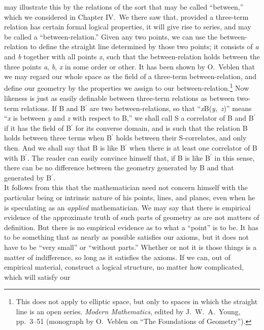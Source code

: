 {may illustrate this by the relations of the sort that may
be called
``between,'' which we considered in Chapter IV.\ We there saw that,
provided a three-term relation has certain formal logical properties,
it will give rise to series, and may be called a ``between-relation.''
Given any two points, we can use the between-relation to define the
straight line determined by those two points; it consists of \textit{a} and \textit{b}
together with all points \textit{x},
such that the between-relation holds
between the three points \textit{a},
\textit{b}, \textit{x} in some order or
other. It has been
shown by O.\ Veblen that we may regard our whole space as the field of a
three-term between-relation, and define our geometry by the properties
we assign to our between-relation.\footnote{This does not apply to
elliptic space, but only to spaces
in
which
the straight line is an open series. \textit{Modern Mathematics},
edited by J.\ W.\ A.\ Young, pp.\ 3--51 (monograph by O.\ Veblen on ``The Foundations of
Geometry'').} Now likeness
is just as easily  
definable between three-term relations as between two-term relations.
If B and B$^\prime$
are two between-relations, so that ``\textit{x}B(\textit{y},~\textit{z})'' means ``\textit{x} is
between \textit{y}
and \textit{z} with
respect to B,'' we shall call S a correlator of B
and B$^\prime$
if it has the field of B$^\prime$
for its converse domain, and is such
that the relation B holds between three terms when B$^\prime$ holds between
their S-correlates, and only then. And we shall say that B is
like B$^\prime$
when there is at least one correlator of B with B$^\prime$. The reader can
easily convince himself that, if B is like B$^\prime$ in this sense,
there can
be no difference between the geometry generated by B and that generated
by B$^\prime$.\\
\indent It follows from this that the mathematician need not
concern
himself
with the particular being or intrinsic nature of his points, lines, and
planes, even when he is speculating as an \textit{applied}
mathematician. We may
say that there is empirical evidence of the approximate truth of such
parts of geometry as are not matters of definition. But there is no
empirical evidence as to what a ``point'' is to be. It has to be
something that as nearly as possible satisfies our axioms, but it does
not have to be ``very small'' or ``without parts.'' Whether or not it is
those things is a matter of indifference, so long as it satisfies the
axioms. If we can, out of empirical material, construct a logical
structure, no matter how complicated, which will satisfy our
}
